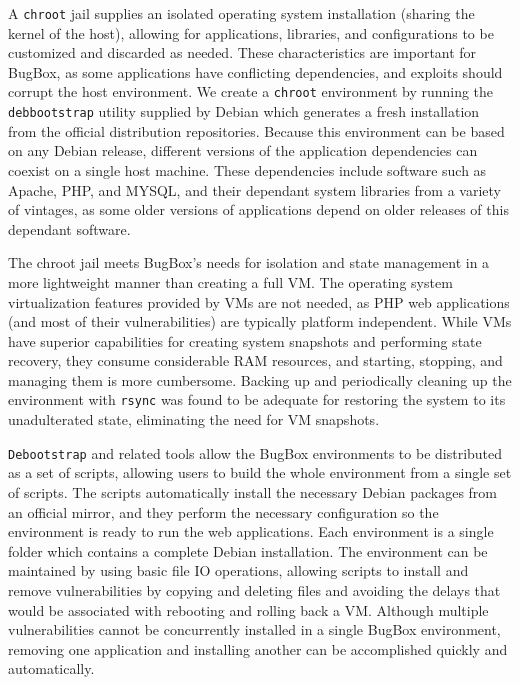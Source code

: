 \documentclass[letterpaper,twocolumn,10pt]{article}
\begin{document}
A \texttt{chroot} jail supplies an isolated operating system installation (sharing the kernel of the host), allowing for applications, libraries, and configurations to be customized and discarded as needed. These characteristics are important for BugBox, as some applications have conflicting dependencies, and exploits should corrupt the host environment. We create a \texttt{chroot} environment by running the \texttt{debbootstrap} utility supplied by Debian which generates a fresh installation from the official distribution repositories. Because this environment can be based on any Debian release, different versions of the application dependencies can coexist on a single host machine. These dependencies include software such as Apache, PHP, and MYSQL, and their dependant system libraries from a variety of vintages, as some older versions of applications depend on older releases of this dependant software.

The chroot jail meets BugBox's needs for isolation and state management in a more lightweight manner than creating a full VM. The operating system virtualization features provided by VMs are not needed, as PHP web applications (and most of their vulnerabilities) are typically platform independent. While VMs have superior capabilities for creating system snapshots and performing state recovery, they consume considerable RAM resources, and starting, stopping, and managing them is more cumbersome. Backing up and periodically cleaning up the environment with \texttt{rsync} was found to be adequate for restoring the system to its unadulterated state, eliminating the need for VM snapshots.

\texttt{Debootstrap} and related tools allow the BugBox environments to be distributed as a set of scripts, allowing users to build the whole environment from a single set of scripts. The scripts automatically install the necessary Debian packages from an official mirror, and they perform the necessary configuration so the environment is ready to run the web applications. Each environment is a single folder which contains a complete Debian installation. The environment can be maintained by using basic file IO operations, allowing scripts to install and remove vulnerabilities by copying and deleting files and avoiding the delays that would be associated with rebooting and rolling back a VM. Although multiple vulnerabilities cannot be concurrently installed in a single BugBox environment, removing one application and installing another can be accomplished quickly and automatically.
\end{document}
